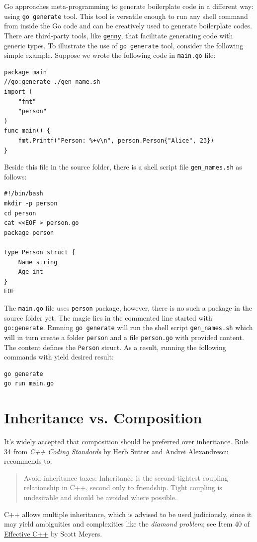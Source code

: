 \documentclass[11pt]{article}
\begin{document}
Go approaches meta-programming to generate boilerplate code in a different way: using \texttt{go generate} tool. This tool is versatile enough to run any shell command from inside the Go code and can be creatively used to generate boilerplate codes. There are third-party tools, like \href{https://github.com/cheekybits/genny}{\texttt{genny}}, that facilitate generating code with generic types. To illustrate the use of \texttt{go generate} tool, consider the following simple example. Suppose we wrote the following code in \texttt{main.go} file:
\begin{verbatim}
package main
//go:generate ./gen_name.sh
import (
	"fmt"
	"person"
)
func main() {
	fmt.Printf("Person: %+v\n", person.Person{"Alice", 23})
}
\end{verbatim}
Beside this file in the source folder, there is a shell script file \texttt{gen\_names.sh} as follows:
\begin{verbatim}
#!/bin/bash
mkdir -p person
cd person
cat <<EOF > person.go
package person

type Person struct {
	Name string
	Age int
}
EOF
\end{verbatim}
The \texttt{main.go} file uses \texttt{person} package, however, there is no such a package in the source folder yet. The magic lies in the commented line started with \texttt{go:generate}. Running \texttt{go generate} will run the shell script \texttt{gen\_names.sh} which will in turn create a folder \texttt{person} and a file \texttt{person.go} with provided content. The content defines the \texttt{Person} struct. As a result, running the following commands with yield desired result:
\begin{verbatim}
go generate
go run main.go
\end{verbatim}

\section*{Inheritance vs. Composition}
\label{sec:orgheadline11}
It's widely accepted that composition should be preferred over inheritance. Rule 34 from \href{http://www.gotw.ca/publications/c++cs.htm}{\emph{C++ Coding Standards}} by Herb Sutter and Andrei Alexandrescu recommends to:
\begin{quote}
Avoid inheritance taxes: Inheritance is the second-tightest coupling relationship in C++, second only to friendship. Tight coupling is undesirable and should be avoided where possible.
\end{quote}
C++ allows multiple inheritance, which is advised to be used judiciously, since it may yield ambiguities and complexities like the \emph{diamond problem}; see Item 40 of \href{http://www.aristeia.com/books.html}{Effective C++} by Scott Meyers.
\end{document}
